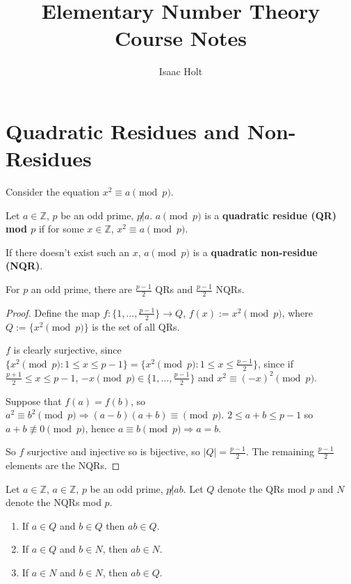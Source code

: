 

\title{Elementary Number Theory Course Notes}
\author{Isaac Holt}





\section{Quadratic Residues and Non-Residues}

Consider the equation $x^2 \equiv a \pmod{p}$.

\begin{definition}
	Let $a \in \mathbb{Z}$, $p$ be an odd prime, $p \not | a$. $a \pmod{p}$ is a \textbf{quadratic residue (QR) mod $p$} if for some $x \in \mathbb{Z}$, $x^2 \equiv a \pmod{p}$.

	If there doesn't exist such an $x$, $a \pmod{p}$ is a \textbf{quadratic non-residue (NQR)}.
\end{definition}

\begin{lemma}
	For $p$ an odd prime, there are $\frac{p - 1}{2}$ QRs and $\frac{p - 1}{2}$ NQRs.
\end{lemma}

\begin{proof}
	Define the map $f: \{1, \dots, \frac{p - 1}{2}\} \rightarrow Q$, $f(x) := x^2 \pmod{p}$, where $Q := \{x^2 \pmod{p}\}$ is the set of all QRs.

	$f$ is clearly surjective, since $\{x^2 \pmod{p}: 1 \le x \le p - 1\} = \{x^2 \pmod{p}: 1 \le x \le \frac{p - 1}{2}\}$, since if $\frac{p + 1}{2} \le x \le p - 1$, $-x \pmod{p} \in \{1, \dots, \frac{p - 1}{2}\}$ and $x^2 \equiv (-x)^2 \pmod{p}$.

	Suppose that $f(a) = f(b)$, so $a^2 \equiv b^2 \pmod{p} \Rightarrow (a - b)(a + b) \equiv \pmod{p}$. $2 \le a + b \le p - 1$ so $a + b \not\equiv 0 \pmod{p}$, hence $a \equiv b \pmod{p} \Rightarrow a = b$.

	So $f$ surjective and injective so is bijective, so $|Q| = \frac{p - 1}{2}$. The remaining $\frac{p - 1}{2}$ elements are the NQRs.
\end{proof}

\begin{lemma}
	Let $a \in \mathbb{Z}$, $a \in \mathbb{Z}$, $p$ be an odd prime, $p \not| ab$. Let $Q$ denote the QRs mod $p$ and $N$ denote the NQRs mod $p$.

	\begin{enumerate}
		\item If $a \in Q$ and $b \in Q$ then $ab \in Q$.
		\item If $a \in Q$ and $b \in N$, then $ab \in N$.
		\item If $a \in N$ and $b \in N$, then $ab \in Q$.
	\end{enumerate}
\end{lemma}

